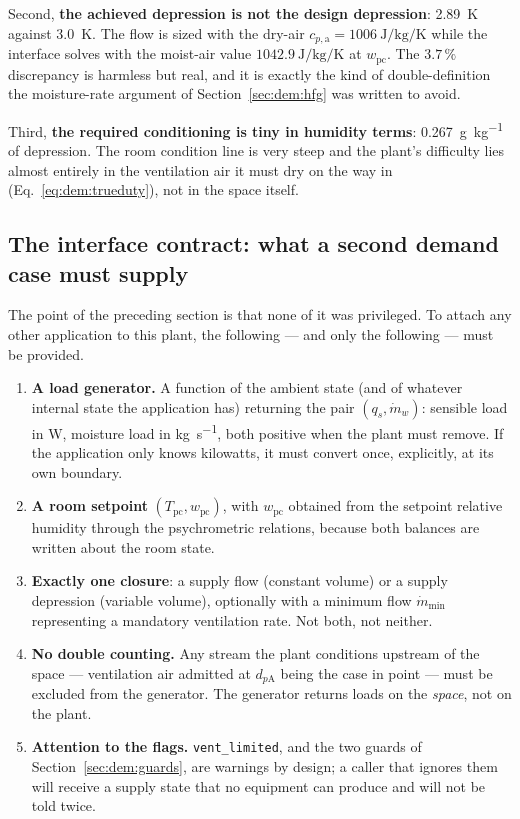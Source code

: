 \documentclass[11pt]{article}
\newcommand{\md}{\ensuremath{\dot m}}
\newcommand{\mdw}{\ensuremath{\dot m_{w}}}
\newcommand{\qs}{\ensuremath{q_{s}}}
\begin{document}
Second, \textbf{the achieved depression is not the design depression}:
\SI{2.89}{\kelvin} against \SI{3.0}{\kelvin}. The flow is sized with the dry-air
$c_{p,\mathrm{a}}=\SI{1006}{\joule\per\kilogram\per\kelvin}$ while the interface
solves with the moist-air value $\SI{1042.9}{\joule\per\kilogram\per\kelvin}$ at
$w_{\mathrm{pc}}$. The $3.7\,\%$ discrepancy is harmless but real, and it is
exactly the kind of double-definition the moisture-rate argument of
Section~\ref{sec:dem:hfg} was written to avoid.

Third, \textbf{the required conditioning is tiny in humidity terms}:
\SI{0.267}{\gram\per\kilogram} of depression. The room condition line is very
steep and the plant's difficulty lies almost entirely in the ventilation air it
must dry on the way in (Eq.~\eqref{eq:dem:trueduty}), not in the space itself.

\subsection{The interface contract: what a second demand case must supply}
\label{sec:dem:contract}

The point of the preceding section is that none of it was privileged. To attach
any other application to this plant, the following --- and only the
following --- must be provided.

\begin{enumerate}[nosep]
\item \textbf{A load generator.} A function of the ambient state (and of
whatever internal state the application has) returning the pair
$(\qs,\mdw)$: sensible load in \si{\watt}, moisture load in
\si{\kilogram\per\second}, both positive when the plant must remove. If the
application only knows kilowatts, it must convert once, explicitly, at its own
boundary.
\item \textbf{A room setpoint} $(T_{\mathrm{pc}},w_{\mathrm{pc}})$, with
$w_{\mathrm{pc}}$ obtained from the setpoint relative humidity through the
psychrometric relations, because both balances are written about the room state.
\item \textbf{Exactly one closure}: a supply flow (constant volume) or a supply
depression (variable volume), optionally with a minimum flow $\md_{\min}$
representing a mandatory ventilation rate. Not both, not neither.
\item \textbf{No double counting.} Any stream the plant conditions upstream of
the space --- ventilation air admitted at $d_{p\mathrm{A}}$ being the case in
point --- must be excluded from the generator. The generator returns loads on the
\emph{space}, not on the plant.
\item \textbf{Attention to the flags.} \verb|vent_limited|, and the two guards of
Section~\ref{sec:dem:guards}, are warnings by design; a caller that ignores them
will receive a supply state that no equipment can produce and will not be told
twice.
\end{enumerate}
\end{document}
